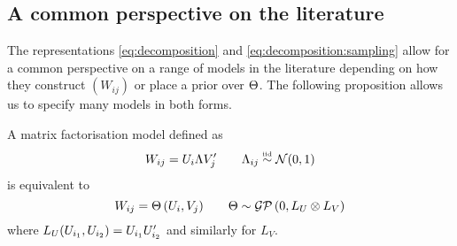 \subsection{A common perspective on the literature}

The representations \eqref{eq:decomposition} and \eqref{eq:decomposition:sampling} allow for a common perspective on a range of models in the literature depending on how they construct $(W_{ij})$ or place a prior over $\Theta$.
The following proposition allows us to specify many models in both forms.

\begin{prop}
\label{prop:matrixfactorisation}
A matrix factorisation model defined as
\begin{equation}
W_{ij} = U_i\Lambda V_j' \quad \quad \Lambda_{ij} \overset{\mbox{\tiny iid}}{\sim} \mathcal{N} (0, 1)
\end{equation}
is equivalent to
\begin{equation}
W_{ij} = \Theta\,(U_i, V_j) \quad \quad \Theta \sim \mathcal{GP}\,(0, L_U \otimes L_V)
\end{equation}
where $L_U(U_{i_1}, U_{i_2}) = U_{i_1}U_{i_2}'$ and similarly for $L_V$.
\end{prop}

